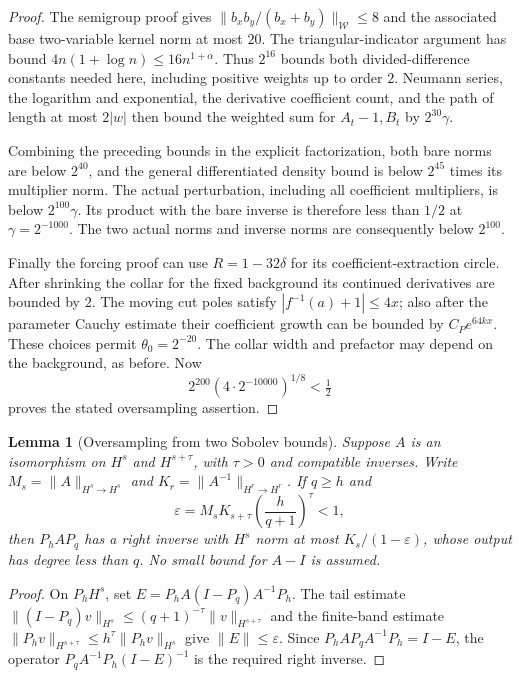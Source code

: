 \documentclass[11pt]{article}
\newtheorem{lemma}[proposition]{Lemma}
\begin{document}
\begin{proof}
The semigroup proof gives
$\|b_xb_y/(b_x+b_y)\|_{\mathcal W}\le8$ and the associated
base two-variable kernel norm at most $20$.
The triangular-indicator argument has bound
$4n(1+\log n)\le16n^{1+\alpha}$.
Thus $2^{16}$ bounds both divided-difference constants
needed here, including positive weights up to order $2$.
Neumann series, the logarithm and exponential, the derivative
coefficient count, and the path of length at most $2|w|$
then bound the weighted sum for $A_t-1,B_t$ by $2^{30}\gamma$.

Combining the preceding bounds in the explicit factorization,
both bare norms are below $2^{40}$, and the general differentiated
density bound is below $2^{45}$ times its multiplier norm.
The actual perturbation, including all coefficient multipliers,
is below $2^{100}\gamma$. Its product with the bare inverse is
therefore less than $1/2$ at $\gamma=2^{-1000}$.
The two actual norms and inverse norms are consequently below
$2^{100}$.

Finally the forcing proof can use $R=1-32\delta$ for its
coefficient-extraction circle. After shrinking the collar for
the fixed background its continued derivatives are bounded by
$2$. The moving cut poles satisfy $|f^{-1}(a)+1|\le4x$;
also after the parameter Cauchy estimate their coefficient growth
can be bounded by $C_Pe^{64kx}$. These choices permit
$\theta_0=2^{-20}$. The collar width and prefactor may depend
on the background, as before. Now
\[
 2^{200}(4\cdot2^{-10000})^{1/8}<\tfrac12
\]
proves the stated oversampling assertion.
\end{proof}


\begin{lemma}[Oversampling from two Sobolev bounds]
\label{lem:sobolev-oversampling}
Suppose $A$ is an isomorphism on $H^s$ and $H^{s+\tau}$, with
$\tau>0$ and compatible inverses. Write
$M_s=\|A\|_{H^s\to H^s}$ and
$K_r=\|A^{-1}\|_{H^r\to H^r}$. If $q\ge h$ and
\[
 \varepsilon=M_sK_{s+\tau}
       \left(\frac h{q+1}\right)^\tau<1,
\]
then $P_hAP_q$ has a right inverse with $H^s$ norm at most
$K_s/(1-\varepsilon)$, whose output has degree less than $q$.
No small bound for $A-I$ is assumed.
\end{lemma}
\begin{proof}
On $P_hH^s$, set $E=P_hA(I-P_q)A^{-1}P_h$.
The tail estimate
$\|(I-P_q)v\|_{H^s}\le(q+1)^{-\tau}\|v\|_{H^{s+\tau}}$
and the finite-band estimate
$\|P_hv\|_{H^{s+\tau}}\le h^\tau\|P_hv\|_{H^s}$
give $\|E\|\le\varepsilon$. Since
$P_hAP_qA^{-1}P_h=I-E$, the operator
$P_qA^{-1}P_h(I-E)^{-1}$ is the required right inverse.
\end{proof}
\end{document}
